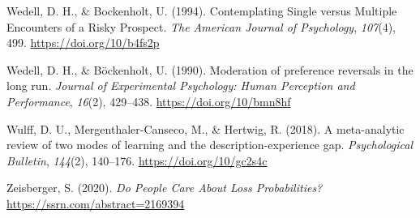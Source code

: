 \documentclass[
  english,
  man, donotrepeattitle,floatsintext]{apa7}
\newlength{\cslhangindent}
\newenvironment{cslreferences}%
  {\setlength{\parindent}{0pt}%
  \everypar{\setlength{\hangindent}{\cslhangindent}}\ignorespaces}%
  {\par}
\theoremstyle{definition}
\theoremstyle{definition}
\theoremstyle{definition}
\theoremstyle{definition}
\theoremstyle{remark}
\begin{document}
\begin{cslreferences}
\leavevmode\hypertarget{ref-wedell1994}{}%
Wedell, D. H., \& Bockenholt, U. (1994). Contemplating Single versus Multiple Encounters of a Risky Prospect. \emph{The American Journal of Psychology}, \emph{107}(4), 499. \url{https://doi.org/10/b4fs2p}

\leavevmode\hypertarget{ref-wedell1990}{}%
Wedell, D. H., \& Böckenholt, U. (1990). Moderation of preference reversals in the long run. \emph{Journal of Experimental Psychology: Human Perception and Performance}, \emph{16}(2), 429--438. \url{https://doi.org/10/bmn8hf}

\leavevmode\hypertarget{ref-wulff2018}{}%
Wulff, D. U., Mergenthaler-Canseco, M., \& Hertwig, R. (2018). A meta-analytic review of two modes of learning and the description-experience gap. \emph{Psychological Bulletin}, \emph{144}(2), 140--176. \url{https://doi.org/10/gc2s4c}

\leavevmode\hypertarget{ref-zeisberger2020}{}%
Zeisberger, S. (2020). \emph{Do People Care About Loss Probabilities?} \url{https://ssrn.com/abstract=2169394}
\end{cslreferences}
\end{document}
